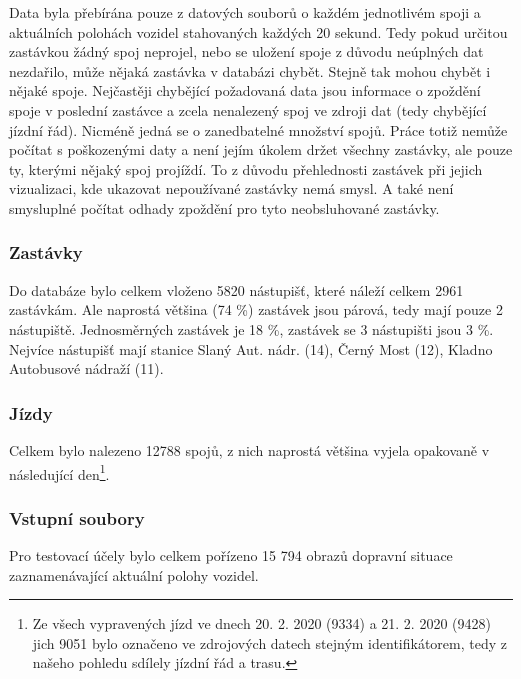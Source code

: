 \bigbreak

Data byla přebírána pouze z datových souborů o každém jednotlivém spoji a aktuálních polohách vozidel stahovaných každých 20 sekund. Tedy pokud určitou zastávkou žádný spoj neprojel, nebo se uložení spoje z důvodu neúplných dat nezdařilo, může nějaká zastávka v databázi chybět. Stejně tak mohou chybět i nějaké spoje. Nejčastěji chybějící požadovaná data jsou informace o zpoždění spoje v poslední zastávce a zcela nenalezený spoj ve zdroji dat (tedy chybějící jízdní řád). Nicméně jedná se o zanedbatelné množství spojů. Práce totiž nemůže počítat s poškozenými daty a není jejím úkolem držet všechny zastávky, ale pouze ty, kterými nějaký spoj projíždí. To z důvodu přehlednosti zastávek při jejich vizualizaci, kde ukazovat nepoužívané zastávky nemá smysl. A také není smysluplné počítat odhady zpoždění pro tyto neobsluhované zastávky.

\subsubsection{Zastávky} \label{subsubsection:zastavky}

Do databáze bylo celkem vloženo 5820 nástupišť, které náleží celkem 2961 zastávkám. Ale naprostá většina (74 \%) zastávek jsou párová, tedy mají pouze 2 nástupiště. Jednosměrných zastávek je 18 \%, zastávek se 3 nástupišti jsou 3 \%. Nejvíce nástupišť mají stanice Slaný Aut. nádr. (14), Černý Most (12), Kladno Autobusové nádraží (11).

\subsubsection{Jízdy}

Celkem bylo nalezeno 12788 spojů, z nich naprostá většina vyjela opakovaně v následující den\footnote{Ze všech vypravených jízd ve dnech 20. 2. 2020 (9334) a 21. 2. 2020 (9428) jich 9051 bylo označeno ve zdrojových datech stejným identifikátorem, tedy z našeho pohledu sdílely jízdní řád a trasu.}.

\subsubsection{Vstupní soubory} \label{subsubsection:vstupni_soubory}

Pro testovací účely bylo celkem pořízeno 15 794 obrazů dopravní situace zaznamenávající aktuální polohy vozidel.

\bigbreak

